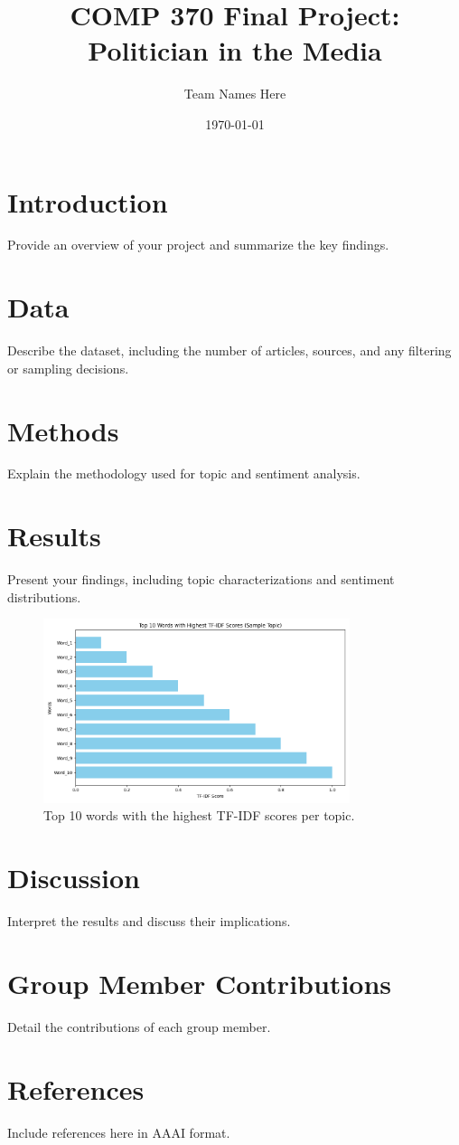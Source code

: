 \documentclass[12pt]{article}
\title{COMP 370 Final Project: Politician in the Media}
\author{Team Names Here}
\date{\today}
\begin{document}
\maketitle

\section{Introduction}
Provide an overview of your project and summarize the key findings.

\section{Data}
Describe the dataset, including the number of articles, sources, and any filtering or sampling decisions.

\section{Methods}
Explain the methodology used for topic and sentiment analysis.

\section{Results}
Present your findings, including topic characterizations and sentiment distributions.

\begin{figure}[H]
    \centering
    \includegraphics[width=0.8\textwidth]{./figures/top_tfidf_words.png}
    \caption{Top 10 words with the highest TF-IDF scores per topic.}
    \label{fig:tfidf}
\end{figure}

\section{Discussion}
Interpret the results and discuss their implications.

\section{Group Member Contributions}
Detail the contributions of each group member.

\section{References}
Include references here in AAAI format.
\end{document}
